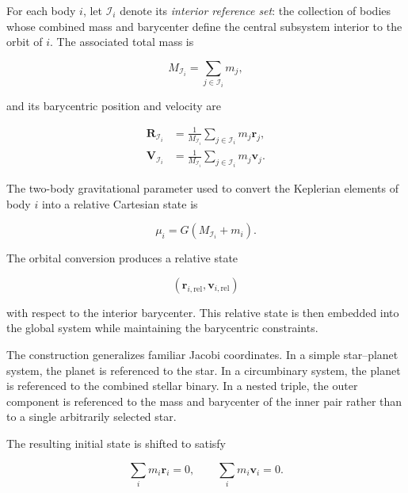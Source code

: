 \documentclass[11pt]{article}
\begin{document}
For each body $i$, let $\mathcal I_i$ denote its \emph{interior reference
set}: the collection of bodies whose combined mass and barycenter define the
central subsystem interior to the orbit of $i$. The associated total mass is

\begin{equation}
    M_{\mathcal I_i}
    =
    \sum_{j\in\mathcal I_i}m_j,
    \label{eq:interior-mass}
\end{equation}

and its barycentric position and velocity are

\begin{align}
    \bm R_{\mathcal I_i}
    &=
    \frac{1}{M_{\mathcal I_i}}
    \sum_{j\in\mathcal I_i}m_j\bm r_j,
    \\
    \bm V_{\mathcal I_i}
    &=
    \frac{1}{M_{\mathcal I_i}}
    \sum_{j\in\mathcal I_i}m_j\bm v_j.
    \label{eq:interior-barycenter}
\end{align}

The two-body gravitational parameter used to convert the Keplerian elements
of body $i$ into a relative Cartesian state is

\begin{equation}
    \mu_i
    =
    G\left(M_{\mathcal I_i}+m_i\right).
    \label{eq:jacobi-mu}
\end{equation}

The orbital conversion produces a relative state

\begin{equation}
    (\bm r_{i,\mathrm{rel}},\bm v_{i,\mathrm{rel}})
\end{equation}

with respect to the interior barycenter. This relative state is then embedded
into the global system while maintaining the barycentric constraints.

The construction generalizes familiar Jacobi coordinates. In a simple
star--planet system, the planet is referenced to the star. In a circumbinary
system, the planet is referenced to the combined stellar binary. In a nested
triple, the outer component is referenced to the mass and barycenter of the
inner pair rather than to a single arbitrarily selected star.

The resulting initial state is shifted to satisfy

\begin{equation}
    \sum_i m_i\bm r_i=0,
    \qquad
    \sum_i m_i\bm v_i=0.
    \label{eq:barycentric-constraints}
\end{equation}
\end{document}
